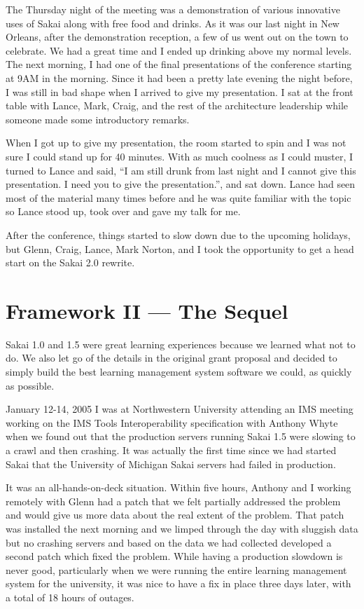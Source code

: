 \documentclass[12pt]{book}
\begin{document}
The Thursday night of the meeting was a
demonstration of various innovative uses of Sakai
along with free food and drinks.  As it
was our last night in New Orleans, after the
demonstration reception, a few of us went
out on the town to celebrate.  We had a great time
and I ended up drinking above my normal levels.
The next morning, I had one of the
final presentations of the conference starting
at 9AM in the morning.  Since it had been a
pretty late evening the night before, I was
still in bad shape when I arrived to give
my presentation.  I sat at the front table
with Lance, Mark, Craig, and the rest of the
architecture leadership while someone made
some introductory remarks.

When I got up to give my presentation, the room
started to spin and I was not sure I could
stand up for 40 minutes.  With as much coolness
as I could muster, I turned to Lance and
said, ``I am still drunk from last night
and I cannot give this presentation.  I need
you to give the presentation.'', and sat down.
Lance had seen most of the material many times
before and he was quite familiar with the topic
so Lance stood up, took over and gave my
talk for me.

After the conference, things started to slow
down due to the upcoming holidays, but Glenn,
Craig, Lance, Mark Norton, and I took the
opportunity to get a head start on the Sakai
2.0 rewrite.

\chapter{Framework II --- The Sequel}

Sakai 1.0 and 1.5 were great learning experiences because
we learned what not to do.  We also let go of the details
in the original grant proposal and decided to simply build
the best learning management system software we could,
as quickly as possible.

January 12-14, 2005 I was at Northwestern University attending
an IMS meeting working on the IMS Tools Interoperability
specification with Anthony Whyte when we found out
that the production servers
running Sakai 1.5 were slowing to a crawl and then crashing.
It was actually the first time since we had started Sakai
that the University of Michigan Sakai servers had failed
in production.

It was an all-hands-on-deck situation.  Within five hours,
Anthony and I working remotely with Glenn had a patch that we felt
partially addressed the problem and would give us more data
about the real extent of the problem.  That patch was
installed the next morning and we limped through the day
with sluggish data but no crashing servers and based on
the data we had collected developed a second patch which
fixed the problem.  While having a production
slowdown is never good, particularly when we were running
the entire learning management system for the university,
it was nice to have a fix in place three days later, with
a total of 18 hours of outages.
\end{document}
